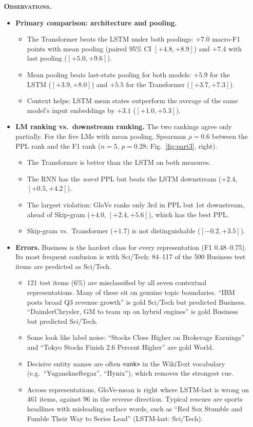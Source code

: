 \documentclass[10pt,a4paper]{article}
\newcommand{\tok}[1]{\texttt{\small #1}}
\newcommand{\obs}[1]{\textsc{\textbf{#1}}}
\begin{document}
\obs{Observations.}
\begin{itemize}
\item \textbf{Primary comparison: architecture and pooling.}
  \begin{itemize}
  \item The Transformer beats the LSTM under both poolings: $+7.0$ macro-F1 points with mean pooling (paired 95\% CI $[+4.8, +8.9]$) and $+7.4$ with last pooling ($[+5.0, +9.6]$).
  \item Mean pooling beats last-state pooling for both models: $+5.9$ for the LSTM ($[+3.9, +8.0]$) and $+5.5$ for the Transformer ($[+3.7, +7.3]$).
  \item Context helps: LSTM mean states outperform the average of the same model's input embeddings by $+3.1$ ($[+1.0, +5.3]$).
  \end{itemize}
\item \textbf{LM ranking vs.\ downstream ranking.} The two rankings agree only partially. For the five LMs with mean pooling, Spearman $\rho=0.6$ between the PPL rank and the F1 rank ($n=5$, $p=0.28$; Fig.~\ref{fig:part3}, right).
  \begin{itemize}
  \item The Transformer is better than the LSTM on both measures.
  \item The RNN has the \emph{worst} PPL but beats the LSTM downstream ($+2.4$, $[+0.5, +4.2]$).
  \item The largest violation: GloVe ranks only 3rd in PPL but 1st downstream, ahead of Skip-gram ($+4.0$, $[+2.4, +5.6]$), which has the best PPL.
  \item Skip-gram vs.\ Transformer ($+1.7$) is not distinguishable ($[-0.2, +3.5]$).
  \end{itemize}
\item \textbf{Errors.} Business is the hardest class for every representation (F1 0.48--0.75). Its most frequent confusion is with Sci/Tech: 84--117 of the 500 Business test items are predicted as Sci/Tech.
  \begin{itemize}
  \item 121 test items (6\%) are misclassified by all seven contextual representations. Many of these sit on genuine topic boundaries. ``IBM posts broad Q3 revenue growth'' is gold Sci/Tech but predicted Business. ``DaimlerChrysler, GM to team up on hybrid engines'' is gold Business but predicted Sci/Tech.
  \item Some look like label noise: ``Stocks Close Higher on Brokerage Earnings'' and ``Tokyo Stocks Finish 2.6 Percent Higher'' are gold World.
  \item Decisive entity names are often \tok{<unk>} in the WikiText vocabulary (e.g.\ ``Yuganskneftegaz'', ``Hynix''), which removes the strongest cue.
  \item Across representations, GloVe-mean is right where LSTM-last is wrong on 461 items, against 96 in the reverse direction. Typical rescues are sports headlines with misleading surface words, such as ``Red Sox Stumble and Fumble Their Way to Series Lead'' (LSTM-last: Sci/Tech).
  \end{itemize}
\end{itemize}
\end{document}
